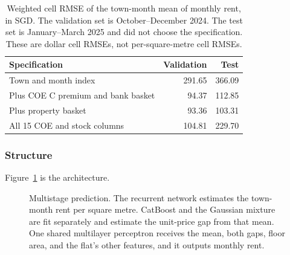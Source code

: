 \documentclass[11pt,a4paper]{article}
\begin{document}
\begin{table}[htbp]
\centering
\caption{Weighted cell RMSE of the town-month mean of monthly rent, in SGD.
The validation set is October--December 2024.
The test set is January--March 2025 and did not choose the specification.
These are dollar cell RMSEs, not per-square-metre cell RMSEs.}
\label{tab:partition}
\small
\begin{tabular}{lrr}
\toprule
Specification & Validation & Test \\
\midrule
Town and month index & 291.65 & 366.09 \\
Plus COE C premium and bank basket & 94.37 & 112.85 \\
Plus property basket & 93.36 & 103.31 \\
All 15 COE and stock columns & 104.81 & 229.70 \\
\bottomrule
\end{tabular}
\end{table}

\subsubsection{Structure}

Figure~\ref{fig:stack} is the architecture.

\begin{figure}[htbp]
\centering
{}
\caption{Multistage prediction.
The recurrent network estimates the town-month rent per square metre.
CatBoost and the Gaussian mixture are fit separately and estimate the unit-price gap from that mean.
One shared multilayer perceptron receives the mean, both gaps, floor area, and the flat's other features, and it outputs monthly rent.}
\label{fig:stack}
\end{figure}
\end{document}
